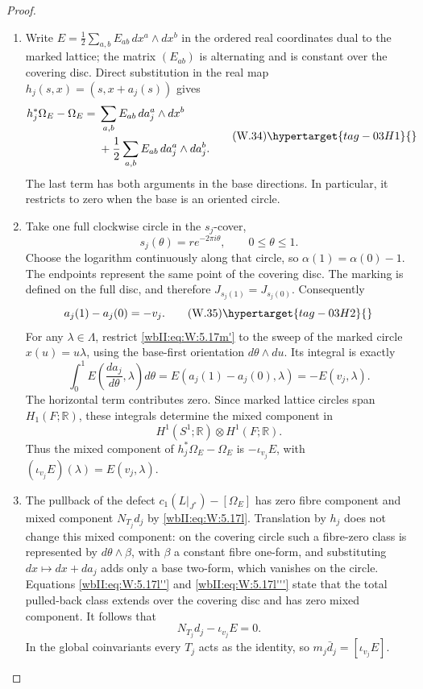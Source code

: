 \begin{proof}
\begin{enumerate}[label=\arabic*.,leftmargin=*]
\item Write \(E=\frac12\sum_{a,b}E_{ab}\,dx^a\wedge dx^b\) in the
ordered real coordinates dual to the marked lattice; the matrix
\((E_{ab})\) is alternating and is constant over the covering
disc.  Direct substitution in the real map
\(h_j(s,x)=(s,x+a_j(s))\) gives
\[
 \begin{split}
 h_j^*\Omega_E-\Omega_E
  ={}&\sum_{a,b}E_{ab}\,d a_j^a\wedge dx^b\\
    &+\frac12\sum_{a,b}E_{ab}\,d a_j^a\wedge d a_j^b.
 \end{split}
 \tag{W.34}\hypertarget{tag-03H1}{}\label{wbII:eq:W:5.17m'}
\]
The last term has both arguments in the base directions.
In particular, it restricts to zero when the base is an oriented
circle.

\item Take one full clockwise circle in the \(s_j\)-cover,
\[
 s_j(\theta)=r e^{-2\pi i\theta},\qquad 0\le\theta\le1.
\]
Choose the logarithm continuously along that circle, so
\(\alpha(1)=\alpha(0)-1\).  The endpoints represent the same
point of the covering disc.  The marking is defined on the full
disc, and therefore \(J_{s_j(1)}=J_{s_j(0)}\).  Consequently
\[
 a_j(1)-a_j(0)=-v_j.
 \tag{W.35}\hypertarget{tag-03H2}{}\label{wbII:eq:W:5.17m''}
\]
For any \(\lambda\in\Lambda\), restrict \eqref{wbII:eq:W:5.17m'} to the sweep of
the marked circle \(x(u)=u\lambda\), using the base-first
orientation \(d\theta\wedge du\).  Its integral is exactly
\[
 \int_0^1 E\!\left(\frac{d a_j}{d\theta},\lambda\right)d\theta
 =E(a_j(1)-a_j(0),\lambda)
 =-E(v_j,\lambda).
\]
The horizontal term contributes zero.  Since marked lattice
circles span \(H_1(F;\mathbb R)\), these integrals determine the
mixed component in
\[
 H^1(S^1;\mathbb R)\otimes H^1(F;\mathbb R).
\]
Thus the mixed component of \(h_j^*\Omega_E-\Omega_E\) is
\(-\iota_{v_j}E\), with \((\iota_{v_j}E)(\lambda)=E(v_j,\lambda)\).

\item The pullback of the defect
\(c_1(L|_{J^*})-[\Omega_E]\) has zero fibre component and mixed
component \(N_{T_j}d_j\) by \eqref{wbII:eq:W:5.17l}.  Translation by \(h_j\) does
not change this mixed component: on the covering circle such
a fibre-zero class is represented by
\(d\theta\wedge\beta\), with \(\beta\) a constant fibre one-form,
and substituting \(dx\mapsto dx+d a_j\) adds only a base two-form,
which vanishes on the circle.  Equations \eqref{wbII:eq:W:5.17l''} and
\eqref{wbII:eq:W:5.17l'''} state that the total pulled-back class extends over
the covering disc and has zero mixed component.  It follows that
\[
 N_{T_j}d_j-\iota_{v_j}E=0.
\]
In the global coinvariants every \(T_j\) acts as the identity,
so \(m_j\bar d_j=[\iota_{v_j}E]\).

\end{enumerate}
\end{proof}
